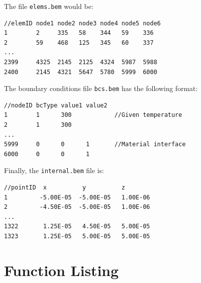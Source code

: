 \documentclass[12pt]{article}
\begin{document}
The file \verb+elems.bem+ would be:

\small\begin{verbatim}
//elemID node1 node2 node3 node4 node5 node6
1        2     335   58    344   59    336
2        59    468   125   345   60    337
...
2399     4325  2145  2125  4324  5987  5988
2400     2145  4321  5647  5780  5999  6000
\end{verbatim}\normalsize

The boundary conditions file \verb+bcs.bem+ has the following format:

\small\begin{verbatim}
//nodeID bcType value1 value2
1        1      300            //Given temperature 
2        1      300
...
5999     0      0      1       //Material interface
6000     0      0      1
\end{verbatim}\normalsize

Finally, the \verb+internal.bem+ file is:

\small\begin{verbatim}
//pointID  x          y          z
1         -5.00E-05  -5.00E-05   1.00E-06
2         -4.50E-05  -5.00E-05   1.00E-06
...
1322       1.25E-05   4.50E-05   5.00E-05
1323       1.25E-05   5.00E-05   5.00E-05
\end{verbatim}\normalsize

\pagebreak

\appendix
\section{Function Listing}

\end{document}
